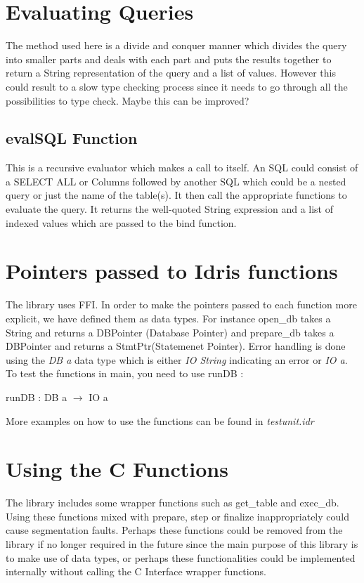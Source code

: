 \documentclass[11pt]{article}
\begin{document}
\section{Evaluating Queries}
\label{Evaluating Queries}
The method used here is a divide and conquer manner which divides the query into smaller
parts and deals with each part and puts the results together to return a String representation
of the query and a list of values.
However this could result to a slow type checking process since it needs to go through all
the possibilities to type check. Maybe this can be improved?

\subsection{evalSQL Function}
\label{evalSQL Function}
This is a recursive evaluator which makes a call to itself.
An SQL could consist of a SELECT ALL or Columns followed by another SQL
which could be a nested query or just the name of the table(s).
It then call the appropriate functions to evaluate the query.
It returns the well-quoted String expression and a list of indexed values which are passed to the bind function.
\section{Pointers passed to Idris functions}
\label{Pointers passed to Idris functions}

The library uses FFI. In order to make the pointers passed to each function more explicit,
we have defined them as data types. For instance open\_db takes a String and returns a DBPointer
(Database Pointer) and prepare\_db
takes a DBPointer and returns a StmtPtr(Statemenet Pointer).
Error handling is done using the \emph {DB a} data type which
is either \emph {IO String} indicating an error or \emph{ IO a}.
To test the functions in main, you need to use runDB :
\begin{center}
\centering                                           runDB : DB a $\rightarrow$ IO a
\end{center}
More examples on how to use the functions can be found in \emph{testunit.idr}

\section{Using the C Functions}
\label{Using the C Functions}
The library includes some wrapper functions such as get\_table
and exec\_db. Using these functions mixed with prepare, step or finalize
inappropriately could cause segmentation faults.
Perhaps these functions could be removed from the library if no longer required in the future
since the main purpose of this library is to make use of data types, or perhaps 
these functionalities could be implemented internally without calling 
the C Interface wrapper functions.
\end{document}
